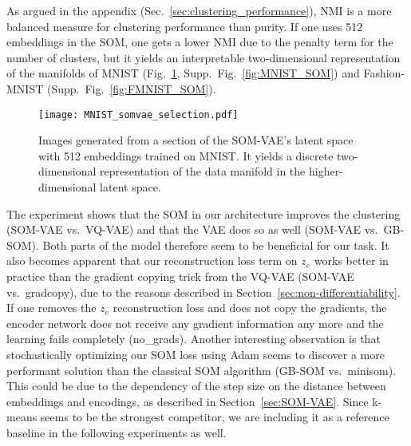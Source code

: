 As argued in the appendix (Sec.~\ref{sec:clustering_performance}), NMI is a more balanced measure for clustering performance than purity.
If one uses 512 embeddings in the SOM, one gets a lower NMI due to the penalty term for the number of clusters, but it yields an interpretable two-dimensional representation of the manifolds of MNIST (Fig.~\ref{fig:MNIST_SOM_selection}, Supp.~Fig.~\ref{fig:MNIST_SOM}) and Fashion-MNIST (Supp.\ Fig.~\ref{fig:FMNIST_SOM}).

\begin{figure}
    \centering
    \texttt{[image: MNIST\_somvae\_selection.pdf]}
    \caption{Images generated from a section of the SOM-VAE's latent space with 512 embeddings trained on MNIST. It yields a discrete two-dimensional representation of the data manifold in the higher-dimensional latent space.}
    \label{fig:MNIST_SOM_selection}
\end{figure}

The experiment shows that the SOM in our architecture improves the clustering (SOM-VAE vs.\ VQ-VAE) and that the VAE does so as well (SOM-VAE vs.\ GB-SOM).
Both parts of the model therefore seem to be beneficial for our task.
It also becomes apparent that our reconstruction loss term on $z_e$ works better in practice than the gradient copying trick from the VQ-VAE (SOM-VAE vs.\ gradcopy), due to the reasons described in Section~\ref{sec:non-differentiability}.
If one removes the $z_e$ reconstruction loss and does not copy the gradients, the encoder network does not receive any gradient information any more and the learning fails completely (no\_grads).
Another interesting observation is that stochastically optimizing our SOM loss using Adam \citep{Kingma2015} seems to discover a more performant solution than the classical SOM algorithm (GB-SOM vs.\ minisom).
This could be due to the dependency of the step size on the distance between embeddings and encodings, as described in Section~\ref{sec:SOM-VAE}.
Since k-means seems to be the strongest competitor, we are including it as a reference baseline in the following experiments as well.



